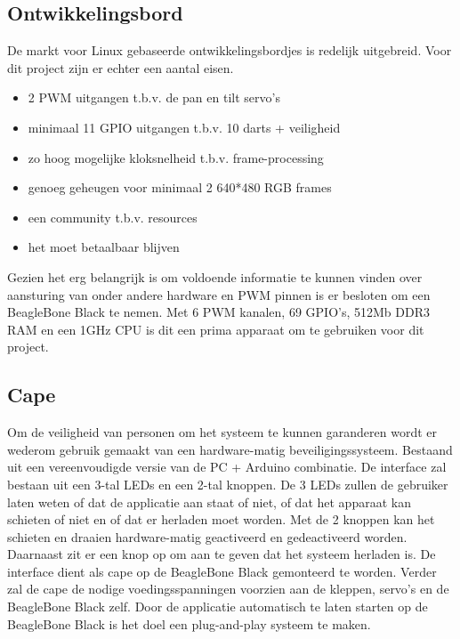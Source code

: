 \subsection{Ontwikkelingsbord}
\label{sub:devboard}
De markt voor Linux gebaseerde ontwikkelingsbordjes is redelijk uitgebreid. Voor
dit project zijn er echter een aantal eisen.

\begin{itemize}
	\item 2 PWM uitgangen t.b.v. de pan en tilt servo's
	\item minimaal 11 GPIO uitgangen t.b.v. 10 darts + veiligheid
	\item zo hoog mogelijke kloksnelheid t.b.v. frame-processing
	\item genoeg geheugen voor minimaal 2 640*480 RGB frames
	\item een community t.b.v. resources
	\item het moet betaalbaar blijven
\end{itemize}

Gezien het erg belangrijk is om voldoende informatie te kunnen vinden over aansturing
van onder andere hardware en PWM pinnen is er besloten om een BeagleBone Black te
nemen. Met 6 PWM kanalen, 69 GPIO's, 512Mb DDR3 RAM en een 1GHz CPU is dit een prima
apparaat om te gebruiken voor dit project.

\subsection{Cape}
\label{sub:cape}
Om de veiligheid van personen om het systeem te kunnen garanderen wordt er wederom
gebruik gemaakt van een hardware-matig beveiligingssysteem. Bestaand uit een
vereenvoudigde versie van de PC + Arduino combinatie.
De interface zal bestaan uit een 3-tal LEDs en een 2-tal knoppen. De 3 LEDs zullen
de gebruiker laten weten of dat de applicatie aan staat of niet, of dat het apparaat
kan schieten of niet en of dat er herladen moet worden.
Met de 2 knoppen kan het schieten en draaien hardware-matig geactiveerd en gedeactiveerd
worden. Daarnaast zit er een knop op om aan te geven dat het systeem herladen is.
De interface dient als cape op de BeagleBone Black gemonteerd te worden. Verder zal de
cape de nodige voedingsspanningen voorzien aan de kleppen, servo's en de BeagleBone Black
zelf. Door de applicatie automatisch te laten starten op de BeagleBone Black is het doel
een plug-and-play systeem te maken.
